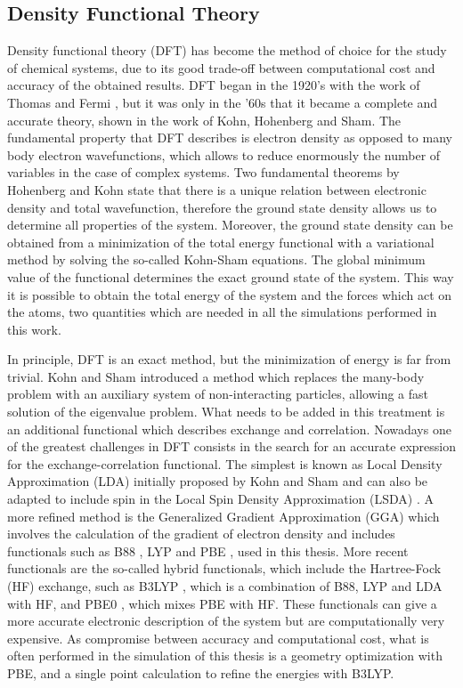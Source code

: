 \subsection*{Density Functional Theory}
Density functional theory (DFT) has become the method of choice for the study of chemical systems, due to its good trade-off between computational cost and accuracy of the obtained results. DFT began in the 1920’s with the work of Thomas and Fermi  \cite{Thomas1927, Fermi1928}, but it was only in the ’60s that it became a complete and accurate theory, shown in the work of Kohn, Hohenberg and Sham\cite{Hohenberg1964}. The fundamental property that DFT describes is electron density as opposed to many body electron wavefunctions, which allows to reduce enormously the number of variables in the case of complex systems. Two fundamental theorems by Hohenberg and Kohn state that there is a unique relation between electronic density and total wavefunction, therefore the ground state density allows us to determine all properties of the system. Moreover, the ground state density can be obtained from a minimization of the total energy functional with a variational method by solving the so-called Kohn-Sham equations. The global minimum value of the functional determines the exact ground state of the system. This way it is possible to obtain the total energy of the system and the forces which act on the atoms, two quantities which are needed in all the simulations performed in this work. 

In principle, DFT is an exact method, but the minimization of energy is far from trivial. Kohn and Sham \cite{Kohn1965} introduced a method which replaces the many-body problem with an auxiliary system of non-interacting particles, allowing a fast solution of the eigenvalue problem. What needs to be added in this treatment is an additional functional which describes exchange and correlation. Nowadays one of the greatest challenges in DFT consists in the search for an accurate expression for the exchange-correlation functional.
 The simplest is known as Local Density Approximation (LDA) initially proposed by Kohn and Sham \cite{Kohn1965} and can also be adapted to include spin in the Local Spin Density Approximation (LSDA) \cite{Vosko1980}. A more refined method is the Generalized Gradient Approximation (GGA) which involves the calculation of the gradient of electron density and includes functionals such as B88 \cite{Becke1988}, LYP \cite{Lee1988} and PBE \cite{Perdew1996, Perdew1997}, used in this thesis. 
 More recent functionals are the so-called hybrid functionals, which include the Hartree-Fock (HF) exchange, such as B3LYP \cite{Becke1988, Becke1993, Lee1988}, which is a combination of B88, LYP and LDA with HF, and PBE0 \cite{Adamo1999}, which mixes PBE with HF. These functionals can give a more accurate electronic description of the system but are computationally very expensive. As compromise between accuracy and computational cost, what is often performed in the simulation of this thesis is a geometry optimization with PBE, and a single point calculation to refine the energies with B3LYP.

